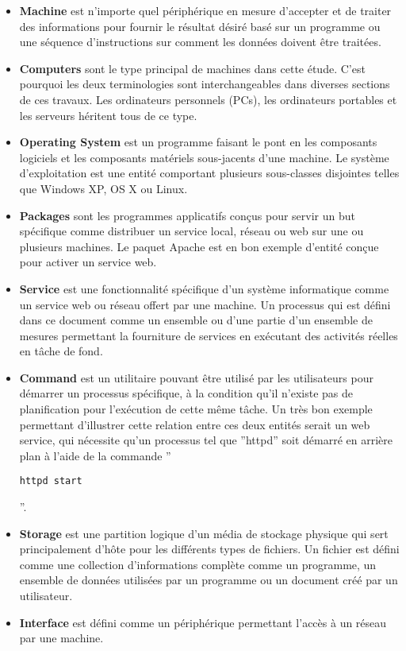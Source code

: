 \begin{itemize}
  \item \textbf{Machine} est n'importe quel périphérique en mesure d'accepter et
	  de traiter des informations pour fournir le résultat désiré basé sur
	  un programme ou une séquence d'instructions sur comment les données
	  doivent être traitées.
  \item \textbf{Computers} sont le type principal de machines dans cette étude.
	  C'est pourquoi les deux terminologies sont interchangeables dans
	  diverses sections de ces travaux. Les ordinateurs personnels (PCs),
	  les ordinateurs portables et les serveurs héritent tous de ce type.
  \item \textbf{Operating System} est un programme faisant le pont en les
	  composants logiciels et les composants matériels sous-jacents d'une
	  machine. Le système d'exploitation est une entité comportant plusieurs
	  sous-classes disjointes telles que Windows XP, OS X ou Linux.
  \item \textbf{Packages} sont les programmes applicatifs conçus pour servir un
	  but spécifique comme distribuer un service local, réseau ou web sur
	  une ou plusieurs machines. Le paquet Apache est en bon exemple
	  d'entité conçue pour activer un service web.
  \item \textbf{Service} est une fonctionnalité spécifique d'un système
	  informatique comme un service web ou réseau offert par une machine. Un
	  processus qui est défini dans ce document comme un ensemble ou d'une
	  partie d'un ensemble de mesures permettant la fourniture de services
	  en exécutant des activités réelles en tâche de fond.
  \item \textbf{Command} est un utilitaire pouvant être utilisé par les
	  utilisateurs pour démarrer un processus spécifique, à la condition
	  qu'il n'existe pas de planification pour l'exécution de cette même
	  tâche. Un très bon exemple permettant d'illustrer cette relation
	  entre ces deux entités serait un web service, qui nécessite qu'un
	  processus tel que ''httpd'' soit démarré en arrière plan à l'aide de
	  la commande ''\begin{verbatim}httpd start\end{verbatim}''.
  \item \textbf{Storage} est une partition logique d'un média de stockage
	  physique qui sert principalement d'hôte pour les différents types de
	  fichiers. Un fichier est défini comme une collection d'informations
	  complète comme un programme, un ensemble de données utilisées par un
	  programme ou un document créé par un utilisateur.
  \item \textbf{Interface} est défini comme un périphérique permettant l'accès à
	  un réseau par une machine.
\end{itemize}

